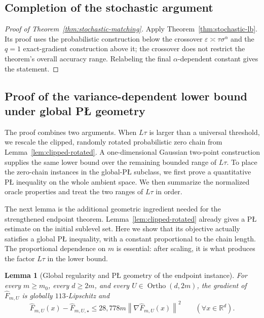 \documentclass[11pt]{article}
\newtheorem{lemma}[theorem]{Lemma}
\newcommand{\R}{\mathbb{R}}
\newcommand{\norm}[1]{\left\lVert #1\right\rVert}
\newcommand{\Ortho}{\operatorname{Ortho}}
\begin{document}
\subsection{Completion of the stochastic argument}
\label{app:sto-completion}

\begin{proof}[Proof of Theorem~\ref{thm:stochastic-matching}]
Apply Theorem~\ref{thm:stochastic-lb}. Its proof uses the probabilistic construction below the crossover
$\varepsilon\asymp\tau\sigma^\alpha$ and the $q=1$ exact-gradient construction above it; the crossover does not
restrict the theorem's overall accuracy range. Relabeling the final $\alpha$-dependent constant gives the statement.
\end{proof}


\subsection{\texorpdfstring{Proof of the variance-dependent lower bound under global P\L{} geometry}{Proof of the variance-dependent lower bound under global PL geometry}}
\label{app:sto-endpoint-proof}

\begingroup
The proof combines two arguments. When $L\tau$ is larger than a universal threshold, we rescale the clipped,
randomly rotated probabilistic zero chain from Lemma~\ref{lem:clipped-rotated}. A one-dimensional Gaussian two-point
construction supplies the same lower bound over the remaining bounded range of $L\tau$. To place the zero-chain
instances in the global-P\L{} subclass, we first prove a quantitative P\L{} inequality on the whole ambient space.
We then summarize the normalized oracle properties and treat the two ranges of $L\tau$ in order.
\endgroup

\begingroup
The next lemma is the additional geometric ingredient needed for the strengthened endpoint theorem. Lemma~\ref{lem:clipped-rotated}
already gives a P\L{} estimate on the initial sublevel set. Here we show that its objective actually satisfies a global
P\L{} inequality, with a constant proportional to the chain length. The proportional dependence on $m$ is essential:
after scaling, it is what produces the factor $L\tau$ in the lower bound.

\begin{lemma}[Global regularity and P\L{} geometry of the endpoint instance]
\label{lem:endpoint-global-pl}
For every $m\ge m_0$, every $d\ge2m$, and every $U\in\Ortho(d,2m)$, the gradient of
$\widehat F_{m,U}$ is globally $113$-Lipschitz and
\[
\widehat F_{m,U}(x)-\widehat F_{m,U,\star}
\le
28{,}778m\norm{\nabla\widehat F_{m,U}(x)}^2
\qquad
(\forall x\in\R^d).
\]
\end{lemma}
\end{document}
